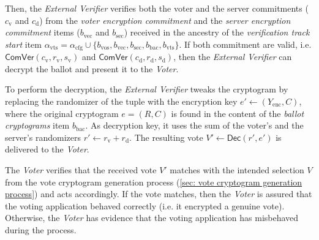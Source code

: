 Then, the \textit{External Verifier} verifies both the voter and the server commitments ($c_\mathrm{v}$ and $c_\mathrm{d}$) from the \textit{voter encryption commitment} and the \textit{server encryption commitment} items ($b_\mathrm{vec}$ and $b_\mathrm{sec}$) received in the ancestry of the \textit{verification track start} item $\alpha_\mathrm{vts} = \alpha_\mathrm{cfg} \cup \{ b_\mathrm{vos}, b_\mathrm{vec}, b_\mathrm{sec}, b_\mathrm{bac}, b_\mathrm{vts} \}$. If both commitment are valid, i.e. $\mathsf{ComVer}(c_\mathrm{v}, r_\mathrm{v}, s_\mathrm{v})$ and $\mathsf{ComVer}(c_\mathrm{d}, r_\mathrm{d}, s_\mathrm{d})$, then the \textit{External Verifier} can decrypt the ballot and present it to the \textit{Voter}.

To perform the decryption, the \textit{External Verifier} tweaks the cryptogram by replacing the randomizer of the tuple with the encryption key $e' \gets (Y_\mathrm{enc}, C)$, where the original cryptogram $e = (R, C)$ is found in the content of the \textit{ballot cryptograms} item $b_\mathrm{bac}$. As decryption key, it uses the sum of the voter's and the server's randomizers $r' \gets r_\mathrm{v} + r_\mathrm{d}$. The resulting vote $V' \gets \mathsf{Dec}(r', e')$ is delivered to the \textit{Voter}.

The \textit{Voter} verifies that the received vote $V'$ matches with the intended selection $V$ from the vote cryptogram generation process (\cref{sec: vote cryptogram generation process}) and acts accordingly. If the vote matches, then the \textit{Voter} is assured that the voting application behaved correctly (i.e. it encrypted a genuine vote). Otherwise, the \textit{Voter} has evidence that the voting application has misbehaved during the process.

